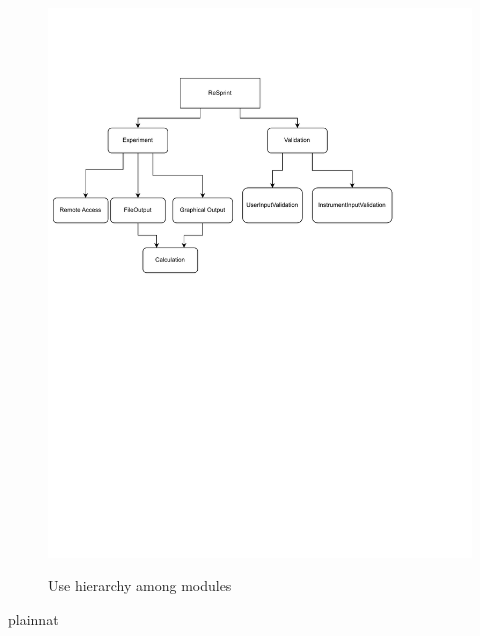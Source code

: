 \documentclass[12pt, titlepage]{article}
\begin{document}
\begin{figure}[H]
\centering
\caption{Use hierarchy among modules}
\includegraphics[scale=0.8]{UseHierarchy.pdf}
\label{FigUH}
\end{figure}


 {plainnat}


\newpage{}
\end{document}

